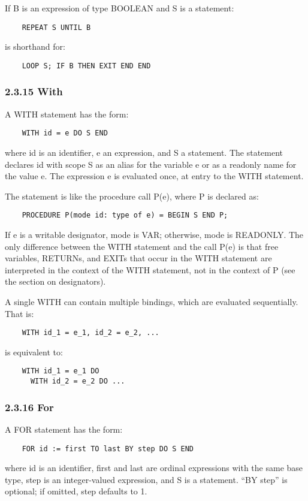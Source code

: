 \documentclass[10pt]{article}
\begin{document}
If B is an expression of type BOOLEAN and S is a statement:
\begin{verbatim}
    REPEAT S UNTIL B
\end{verbatim}
is shorthand for:
\begin{verbatim}
    LOOP S; IF B THEN EXIT END END
\end{verbatim}

\subsubsection*{2.3.15 With}

A WITH statement has the form:
\begin{verbatim}
    WITH id = e DO S END
\end{verbatim}
where id is an identifier, e an expression, and S a statement.  The statement
declares id with scope S as an alias for the variable e or as a readonly name
for the value e.  The expression e is evaluated once, at entry to the WITH
statement.

The statement is like the procedure call P(e), where P is declared as:
\begin{verbatim}
    PROCEDURE P(mode id: type of e) = BEGIN S END P;
\end{verbatim}
If e is a writable designator, mode is VAR; otherwise, mode is READONLY.  The
only difference between the WITH statement and the call P(e) is that free
variables, RETURNs, and EXITs that occur in the WITH statement are interpreted
in the context of the WITH statement, not in the context of P (see the section
on designators).

A single WITH can contain multiple bindings, which are evaluated
sequentially.  That is:
\begin{verbatim}
    WITH id_1 = e_1, id_2 = e_2, ...
\end{verbatim}
 is equivalent to:
\begin{verbatim}
    WITH id_1 = e_1 DO
      WITH id_2 = e_2 DO ...
\end{verbatim}

\subsubsection*{2.3.16 For}

A FOR statement has the form:
\begin{verbatim}
    FOR id := first TO last BY step DO S END
\end{verbatim}
where id is an identifier, first and last are ordinal expressions with the
same base type, step is an integer-valued expression, and S is a
statement.  ``BY step'' is optional; if omitted, step defaults to 1.
\end{document}
